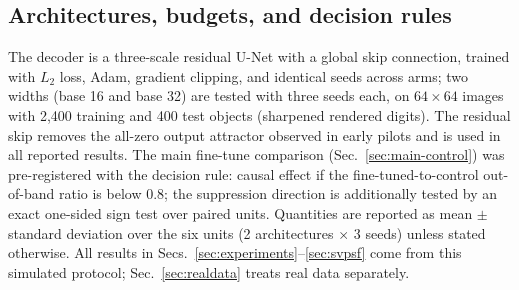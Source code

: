 \subsection{Architectures, budgets, and decision rules}
The decoder is a three-scale residual U-Net with a global skip connection, trained with $L_2$ loss, Adam, gradient clipping, and identical seeds across arms; two widths (base 16 and base 32) are tested with three seeds each, on $64\times64$ images with 2{,}400 training and 400 test objects (sharpened rendered digits). The residual skip removes the all-zero output attractor observed in early pilots and is used in all reported results. The main fine-tune comparison (Sec.~\ref{sec:main-control}) was pre-registered with the decision rule: causal effect if the fine-tuned-to-control out-of-band ratio is below $0.8$; the suppression direction is additionally tested by an exact one-sided sign test over paired units. Quantities are reported as mean $\pm$ standard deviation over the six units (2 architectures $\times$ 3 seeds) unless stated otherwise. All results in Secs.~\ref{sec:experiments}--\ref{sec:svpsf} come from this simulated protocol; Sec.~\ref{sec:realdata} treats real data separately.
